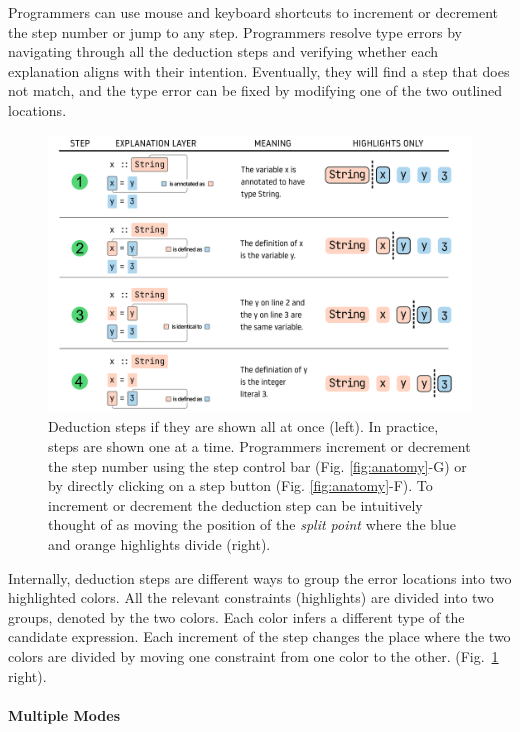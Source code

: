 Programmers can use mouse and keyboard shortcuts to increment or decrement the step number or jump to any step. Programmers resolve type errors by navigating through all the deduction steps and verifying whether each explanation aligns with their intention. Eventually, they will find a step that does not match, and the type error can be fixed by modifying one of the two outlined locations.

\begin{figure}
    \centering
    \includegraphics[width=\linewidth, trim=0mm 0mm 0mm 0mm]{images/step-explain.pdf}
    \caption{
Deduction steps if they are shown all at once (left). In practice, steps are shown one at a time. Programmers increment or decrement the step number using the step control bar (Fig. \ref{fig:anatomy}-G) or by directly clicking on a step button (Fig. \ref{fig:anatomy}-F). To increment or decrement the deduction step can be intuitively thought of as moving the position of the \textit{split point} where the blue and orange highlights divide (right).
        }
    \label{fig:step-interface}
\end{figure}

Internally, deduction steps are different ways to group the error locations into two highlighted colors. All the relevant constraints (highlights) are divided into two groups, denoted by the two colors. Each color infers a different type of the candidate expression. Each increment of the step changes the place where the two colors are divided by moving one constraint from one color to the other.  (Fig.~\ref{fig:step-interface} right).


\paragraph{Multiple Modes}

